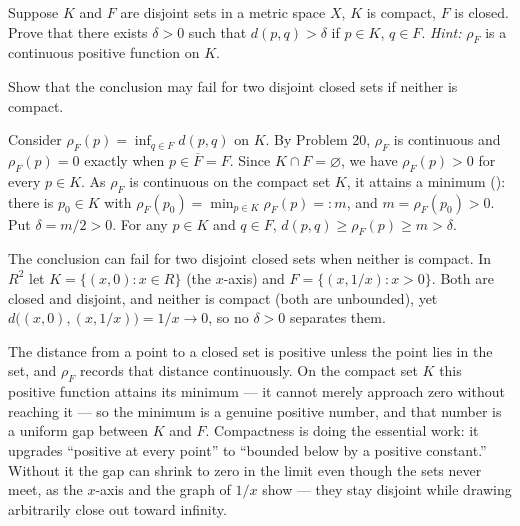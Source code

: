 \documentclass[main.tex]{subfiles}
\begin{document}
Suppose $K$ and $F$ are disjoint sets in a metric space $X$, $K$ is compact, $F$ is closed. Prove that there exists $\delta > 0$ such that $d(p, q) > \delta$ if $p \in K$, $q \in F$. \textit{Hint:} $\rho_{F}$ is a continuous positive function on $K$.

Show that the conclusion may fail for two disjoint closed sets if neither is compact.
\begin{SolutionBlue}
Consider $\rho_{F}(p) = \inf_{q \in F} d(p, q)$ on $K$. By Problem 20, $\rho_{F}$ is continuous and $\rho_{F}(p) = 0$ exactly when $p \in \overline{F} = F$. Since $K \cap F = \varnothing$, we have $\rho_{F}(p) > 0$ for every $p \in K$. As $\rho_{F}$ is continuous on the compact set $K$, it attains a minimum (): there is $p_{0} \in K$ with $\rho_{F}(p_{0}) = \min_{p \in K} \rho_{F}(p) =: m$, and $m = \rho_{F}(p_{0}) > 0$. Put $\delta = m/2 > 0$. For any $p \in K$ and $q \in F$, $d(p, q) \ge \rho_{F}(p) \ge m > \delta$.

The conclusion can fail for two disjoint closed sets when neither is compact. In $R^{2}$ let $K = \{(x, 0) : x \in R\}$ (the $x$-axis) and $F = \{(x, 1/x) : x > 0\}$. Both are closed and disjoint, and neither is compact (both are unbounded), yet $d\big((x, 0), (x, 1/x)\big) = 1/x \to 0$, so no $\delta > 0$ separates them.
\end{SolutionBlue}
\begin{Reflection}
The distance from a point to a closed set is positive unless the point lies in the set, and $\rho_{F}$ records that distance continuously. On the compact set $K$ this positive function attains its minimum --- it cannot merely approach zero without reaching it --- so the minimum is a genuine positive number, and that number is a uniform gap between $K$ and $F$. Compactness is doing the essential work: it upgrades ``positive at every point'' to ``bounded below by a positive constant.'' Without it the gap can shrink to zero in the limit even though the sets never meet, as the $x$-axis and the graph of $1/x$ show --- they stay disjoint while drawing arbitrarily close out toward infinity.
\end{Reflection}
\end{document}

